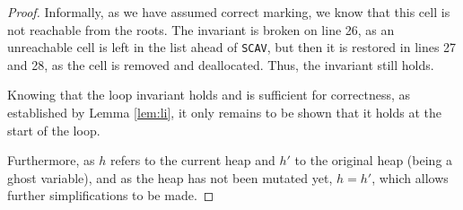 \begin{proof}
  Informally, as we have assumed correct marking, we know that this
  cell is not reachable from the roots. The invariant is broken on
  line 26, as an unreachable cell is left in the list ahead of
  \texttt{SCAV}, but then it is restored in lines 27 and 28, as the
  cell is removed and deallocated. Thus, the invariant still holds.

  Knowing that the loop invariant holds and is sufficient for
  correctness, as established by Lemma \ref{lem:li}, it only remains
  to be shown that it holds at the start of the loop.

  \begin{prooftree}
  \end{prooftree}

  Furthermore, as $h$ refers to the current heap and $h'$ to the
  original heap (being a ghost variable), and as the heap has not been
  mutated yet, $h = h'$, which allows further simplifications to be
  made.


\end{proof}
